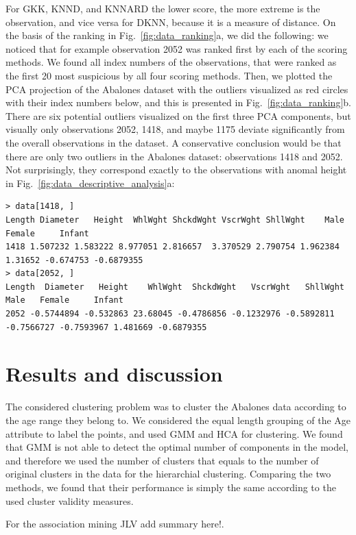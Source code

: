\documentclass[10pt, paper=a4]{article}
\begin{document}
For GKK, KNND, and KNNARD the lower score, the more extreme is the observation,
and vice versa for DKNN, because it is a measure of distance.  On the basis of
the ranking in Fig.~\ref{fig:data_ranking}a, we did the following: we noticed
that for example observation 2052 was ranked first by each of the scoring
methods.  We found all index numbers of the observations, that were ranked as
the first 20 most suspicious by all four scoring methods.  Then, we plotted the
PCA projection of the Abalones dataset with the outliers visualized as red
circles with their index numbers below, and this is presented in
Fig.~\ref{fig:data_ranking}b.  There are six potential outliers visualized on
the first three PCA components, but visually only observations 2052, 1418, and
maybe 1175 deviate significantly from the overall observations in the dataset.
A conservative conclusion would be that there are only two outliers in the
Abalones dataset: observations 1418 and 2052.  Not surprisingly, they correspond
exactly to the observations with anomal height in
Fig.~\ref{fig:data_descriptive_analysis}a:
\begin{verbatim}
> data[1418, ]
Length Diameter   Height  WhlWght ShckdWght VscrWght ShllWght    Male    Female     Infant
1418 1.507232 1.583222 8.977051 2.816657  3.370529 2.790754 1.962384 1.31652 -0.674753 -0.6879355
> data[2052, ]
Length  Diameter   Height    WhlWght  ShckdWght   VscrWght   ShllWght       Male   Female     Infant
2052 -0.5744894 -0.532863 23.68045 -0.4786856 -0.1232976 -0.5892811 -0.7566727 -0.7593967 1.481669 -0.6879355
\end{verbatim}

\section{Results and discussion}
\label{sec:results_and_discussion}
The considered clustering problem was to cluster the Abalones data according to
the age range they belong to.  We considered the equal length grouping of the
Age attribute to label the points, and used GMM and HCA for clustering.  We
found that GMM is not able to detect the optimal number of components in the
model, and therefore we used the number of clusters that equals to the number of
original clusters in the data for the hierarchial clustering.  Comparing the two
methods, we found that their performance is simply the same according to the
used cluster validity measures.

For the association mining {JLV \color{red} add summary here!}.
\end{document}
